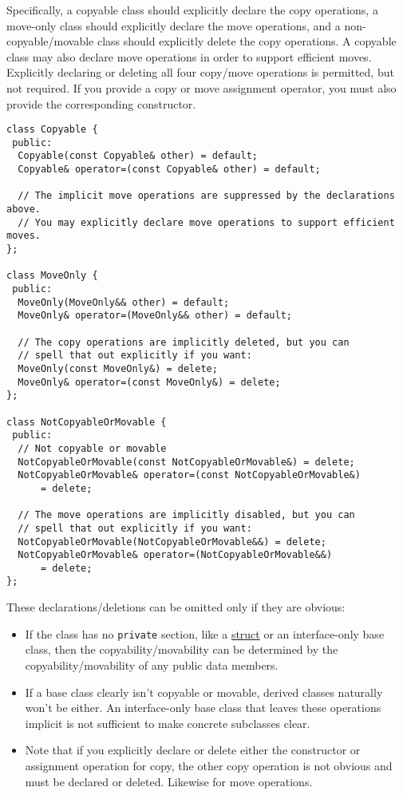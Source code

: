 Specifically, a copyable class should explicitly declare the copy operations, a move-only class should explicitly declare the move operations, and a non-copyable/movable class should explicitly delete the copy operations. A copyable class may also declare move operations in order to support efficient moves. Explicitly declaring or deleting all four copy/move operations is permitted, but not required. If you provide a copy or move assignment operator, you must also provide the corresponding constructor.
\begin{verbatim}
class Copyable {
 public:
  Copyable(const Copyable& other) = default;
  Copyable& operator=(const Copyable& other) = default;

  // The implicit move operations are suppressed by the declarations above.
  // You may explicitly declare move operations to support efficient moves.
};

class MoveOnly {
 public:
  MoveOnly(MoveOnly&& other) = default;
  MoveOnly& operator=(MoveOnly&& other) = default;

  // The copy operations are implicitly deleted, but you can
  // spell that out explicitly if you want:
  MoveOnly(const MoveOnly&) = delete;
  MoveOnly& operator=(const MoveOnly&) = delete;
};

class NotCopyableOrMovable {
 public:
  // Not copyable or movable
  NotCopyableOrMovable(const NotCopyableOrMovable&) = delete;
  NotCopyableOrMovable& operator=(const NotCopyableOrMovable&)
      = delete;

  // The move operations are implicitly disabled, but you can
  // spell that out explicitly if you want:
  NotCopyableOrMovable(NotCopyableOrMovable&&) = delete;
  NotCopyableOrMovable& operator=(NotCopyableOrMovable&&)
      = delete;
};
\end{verbatim}

These declarations/deletions can be omitted only if they are obvious:

\begin{itemize}
    \item If the class has no \texttt{private} section, like a \hyperref[sec:structs-vs.-classes]{struct} or an interface-only base class, then the copyability/movability can be determined by the copyability/movability of any public data members.
    \item If a base class clearly isn't copyable or movable, derived classes naturally won't be either. An interface-only base class that leaves these operations implicit is not sufficient to make concrete subclasses clear.
    \item Note that if you explicitly declare or delete either the constructor or assignment operation for copy, the other copy operation is not obvious and must be declared or deleted. Likewise for move operations.
\end{itemize}

